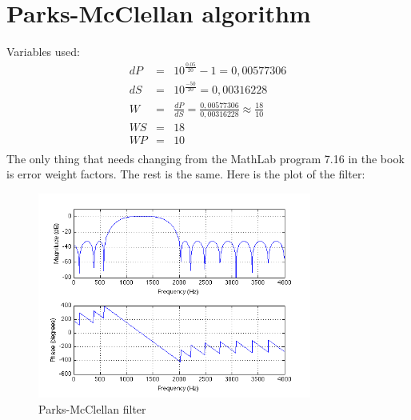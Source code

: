 \documentclass[a4wide,10pt]{article}
\begin{document}
	\section{Parks-McClellan algorithm} %
	\label{sec:parks_mcclellan_algorithm}
		Variables used:
		\begin{eqnarray}
			dP &=& 10^{\frac{0.05}{20}} -1 = 0,00577306 \nonumber \\
			dS &=& 10^{\frac{-50}{20}} = 0,00316228 \nonumber \\
			W &=& \frac{dP}{dS} = \frac{0,00577306}{0,00316228} \approx \frac{18}{10} \nonumber \\
			WS &=& 18 \nonumber \\
			WP &=& 10 \nonumber \\
		\end{eqnarray}
		The only thing that needs changing from the MathLab program 7.16 in the book is error weight factors. The rest is the same. Here is the plot of the filter:
		\begin{figure}[h]
			\centering
				\includegraphics[width=9cm]{images/opgave_4.png}
			\caption{Parks-McClellan filter}
			\label{fig:images_opgave_4}
		\end{figure}
		
\end{document}
